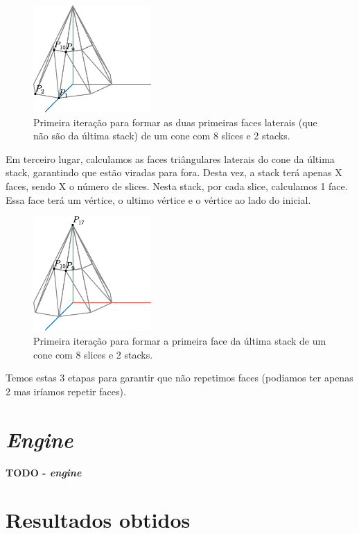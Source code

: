 \documentclass[12pt, a4paper]{article}
\begin{document}
\begin{figure}[H]
    \centering
    \includegraphics[width=0.4\textwidth]{res/figures/Cone4.pdf}
    \caption{
        Primeira iteração para formar as duas primeiras faces laterais (que
        não são da última stack) de um cone com 8 slices e 2 stacks.
    }
\end{figure}

Em terceiro lugar, calculamos as faces triângulares laterais do cone da última stack, garantindo
que estão viradas para fora. Desta vez, a stack terá apenas X faces, sendo X o número de slices.
Nesta stack, por cada slice, calculamos 1 face. Essa face terá um vértice, o ultimo vértice e o
vértice ao lado do inicial.

\begin{figure}[H]
    \centering
    \includegraphics[width=0.4\textwidth]{res/figures/Cone5.pdf}
    \caption{
        Primeira iteração para formar a primeira face da última stack de um cone com 8 slices
        e 2 stacks.
    }
\end{figure}

Temos estas 3 etapas para garantir que não repetimos faces (podiamos ter apenas 2 mas iríamos
repetir faces).

\section{\emph{Engine}}

\textbf{\color{red} TODO - \emph{engine}}

\section{Resultados obtidos}
\end{document}

